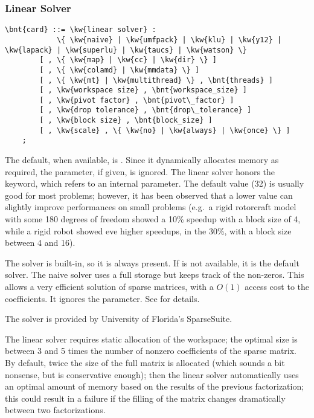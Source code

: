 \subsubsection{Linear Solver}   
\label{sec:LINEAR-SOLVER}
\begin{Verbatim}[commandchars=\\\{\}]
    \bnt{card} ::= \kw{linear solver} :
            \{ \kw{naive} | \kw{umfpack} | \kw{klu} | \kw{y12} | \kw{lapack} | \kw{superlu} | \kw{taucs} | \kw{watson} \}
        [ , \{ \kw{map} | \kw{cc} | \kw{dir} \} ]
        [ , \{ \kw{colamd} | \kw{mmdata} \} ]
        [ , \{ \kw{mt} | \kw{multithread} \} , \bnt{threads} ]
        [ , \kw{workspace size} , \bnt{workspace_size} ] 
        [ , \kw{pivot factor} , \bnt{pivot\_factor} ]
        [ , \kw{drop tolerance} , \bnt{drop\_tolerance} ]
        [ , \kw{block size} , \bnt{block_size} ]
        [ , \kw{scale} , \{ \kw{no} | \kw{always} | \kw{once} \} ]
    ;
\end{Verbatim}

The default, when available, is .
Since it dynamically allocates memory as required, the  
parameter, if given, is ignored.
The  linear solver honors the  keyword,
which refers to an internal parameter.
The default value (32) is usually good for most problems; however,
it has been observed that a lower value can slightly improve
performances on small problems (e.g.\ a rigid rotorcraft model
with some 180 degrees of freedom showed a 10\% speedup with 
a block size of 4, while a rigid robot showed eve higher speedups,
in the 30\%, with a block size between 4 and 16).

The  solver is built-in, so it is always present.
If  is not available, it is the default solver.
The naive solver uses a full storage but keeps track of the non-zeros.
This allows a very efficient solution of sparse matrices, with
a $O(1)$ access cost to the coefficients.
It ignores the  parameter.
See \cite{NAIVE-2007} for details.

The  solver is provided by University of Florida's SparseSuite.

The  linear solver requires static allocation of the workspace;
the optimal size  is between 3 and 5 times
the number of nonzero coefficients of the sparse matrix.
By default, twice the size of the full matrix is allocated
(which sounds a bit nonsense, but is conservative enough);
then the linear solver automatically uses an optimal amount of memory
based on the results of the previous factorization; this could
result in a failure if the filling of the matrix changes 
dramatically between two factorizations.

